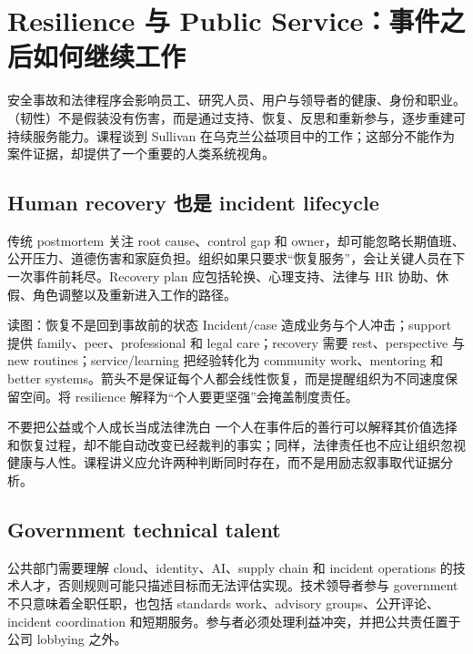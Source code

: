 \section{Resilience 与 Public Service：事件之后如何继续工作}

安全事故和法律程序会影响员工、研究人员、用户与领导者的健康、身份和职业。（韧性）不是假装没有伤害，而是通过支持、恢复、反思和重新参与，逐步重建可持续服务能力。课程谈到 Sullivan 在乌克兰公益项目中的工作；这部分不能作为案件证据，却提供了一个重要的人类系统视角。

\subsection{Human recovery 也是 incident lifecycle}

传统 postmortem 关注 root cause、control gap 和 owner，却可能忽略长期值班、公开压力、道德伤害和家庭负担。组织如果只要求“恢复服务”，会让关键人员在下一次事件前耗尽。Recovery plan 应包括轮换、心理支持、法律与 HR 协助、休假、角色调整以及重新进入工作的路径。


\begin{knowledgebox}{读图：恢复不是回到事故前的状态}
Incident/case 造成业务与个人冲击；support 提供 family、peer、professional 和 legal care；recovery 需要 rest、perspective 与 new routines；service/learning 把经验转化为 community work、mentoring 和 better systems。箭头不是保证每个人都会线性恢复，而是提醒组织为不同速度保留空间。将 resilience 解释为“个人要更坚强”会掩盖制度责任。
\end{knowledgebox}

\begin{warningbox}{不要把公益或个人成长当成法律洗白}
一个人在事件后的善行可以解释其价值选择和恢复过程，却不能自动改变已经裁判的事实；同样，法律责任也不应让组织忽视健康与人性。课程讲义应允许两种判断同时存在，而不是用励志叙事取代证据分析。
\end{warningbox}

\subsection{Government technical talent}

公共部门需要理解 cloud、identity、AI、supply chain 和 incident operations 的技术人才，否则规则可能只描述目标而无法评估实现。技术领导者参与 government 不只意味着全职任职，也包括 standards work、advisory groups、公开评论、incident coordination 和短期服务。参与者必须处理利益冲突，并把公共责任置于公司 lobbying 之外。

